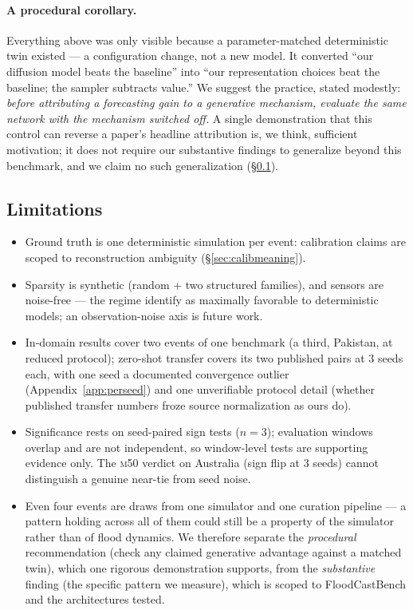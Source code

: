 \documentclass[11pt]{article}
\newcommand{\mfifty}{\textsc{m50}}
\begin{document}
\paragraph{A procedural corollary.} Everything above was only visible
because a parameter-matched deterministic twin existed --- a
configuration change, not a new model. It converted ``our diffusion model
beats the baseline'' into ``our representation choices beat the baseline;
the sampler subtracts value.'' We suggest the practice, stated modestly:
\emph{before attributing a forecasting gain to a generative mechanism,
evaluate the same network with the mechanism switched off.} A single
demonstration that this control can reverse a paper's headline
attribution is, we think, sufficient motivation; it does not require our
substantive findings to generalize beyond this benchmark, and we claim no
such generalization (\S\ref{sec:limitations}).

\subsection{Limitations}
\label{sec:limitations}
\begin{itemize}
  \item Ground truth is one deterministic simulation per event:
    calibration claims are scoped to reconstruction ambiguity
    (\S\ref{sec:calibmeaning}).
  \item Sparsity is synthetic (random + two structured families), and
    sensors are noise-free --- the regime
    \citet{spatiallyawarediffusion2024} identify as maximally favorable
    to deterministic models; an observation-noise axis is future work.
  \item In-domain results cover two events of one benchmark (a third,
    Pakistan, at reduced protocol); zero-shot transfer covers its two
    published pairs at 3 seeds each, with one seed a documented
    convergence outlier (Appendix~\ref{app:perseed}) and one
    unverifiable protocol detail (whether published transfer numbers
    froze source normalization as ours do).
  \item Significance rests on seed-paired sign tests ($n{=}3$);
    evaluation windows overlap and are not independent, so window-level
    tests are supporting evidence only. The \mfifty{} verdict on
    Australia (sign flip at 3 seeds) cannot distinguish a genuine
    near-tie from seed noise.
  \item Even four events are draws from one simulator and one curation
    pipeline --- a pattern holding across all of them could still be a
    property of the simulator rather than of flood dynamics. We
    therefore separate the \emph{procedural} recommendation (check any
    claimed generative advantage against a matched twin), which one
    rigorous demonstration supports, from the \emph{substantive}
    finding (the specific pattern we measure), which is scoped to
    FloodCastBench and the architectures tested.
\end{itemize}
\end{document}
